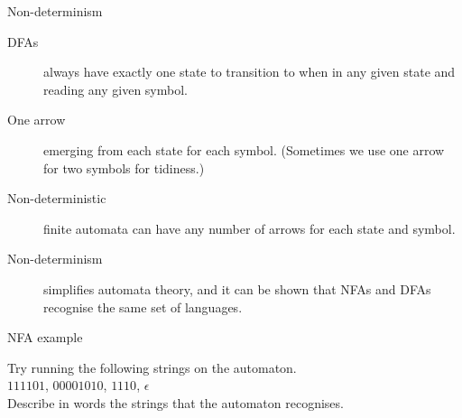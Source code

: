 \begin{frame}{Non-determinism}
  \begin{description}
    \item[DFAs] always have exactly one state to transition to when in any given state and reading any given symbol.
    \vspace{4mm}
    \item[One arrow] emerging from each state for each symbol. (Sometimes we use one arrow for two symbols for tidiness.)
    \vspace{4mm}
    \item[Non-deterministic] finite automata can have any number of arrows for each state and symbol.
    \vspace{4mm}
    \item[Non-determinism] simplifies automata theory, and it can be shown that NFAs and DFAs recognise the same set of languages.
  \end{description}
\end{frame}


\begin{frame}[fragile]{NFA example}
  \begin{center}
  \end{center}
  \begin{center}
    Try running the following strings on the automaton. \\
    $111101$, $00001010$, $1110$, $\epsilon$ \\
    Describe in words the strings that the automaton recognises.
  \end{center}
\end{frame}


